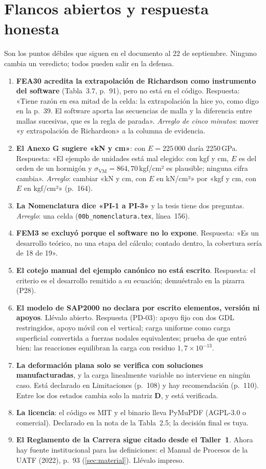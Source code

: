 \documentclass[11pt,a4paper]{article}
\begin{document}
\section{Flancos abiertos y respuesta honesta}\label{sec:flancos}

Son los puntos débiles que siguen en el documento al 22 de septiembre. Ninguno cambia un veredicto; todos pueden salir en la defensa.

\begin{enumerate}[leftmargin=1.6em]
\item \textbf{FEA30 acredita la extrapolación de Richardson como instrumento del software} (Tabla~3.7, p.~91), pero no está en el código. Respuesta: «Tiene razón en esa mitad de la celda: la extrapolación la hice yo, como digo en la p.~39. El software aporta las secuencias de malla y la diferencia entre mallas sucesivas, que es la regla de parada». \emph{Arreglo de cinco minutos}: mover «y extrapolación de Richardson» a la columna de evidencia.
\item \textbf{El Anexo G sugiere «kN y cm»}: con $E=225\,000$ daría 2250\,GPa. Respuesta: «El ejemplo de unidades está mal elegido: con kgf y cm, $E$ es del orden de un hormigón y $\sigma_{\mathrm{VM}}=864{,}70$\,kgf/cm² es plausible; ninguna cifra cambia». \emph{Arreglo}: cambiar «kN y cm, con $E$ en kN/cm²» por «kgf y cm, con $E$ en kgf/cm²» (p.~164).
\item \textbf{La Nomenclatura dice «PI-1 a PI-3»} y la tesis tiene dos preguntas. \emph{Arreglo}: una celda (\texttt{00b\_nomenclatura.tex}, línea~156).
\item \textbf{FEM3 se excluyó porque el software no lo expone}. Respuesta: «Es un desarrollo teórico, no una etapa del cálculo; contado dentro, la cobertura sería de 18 de 19».
\item \textbf{El cotejo manual del ejemplo canónico no está escrito}. Respuesta: el criterio es el desarrollo remitido a su ecuación; demuéstralo en la pizarra (P28).
\item \textbf{El modelo de SAP2000 no declara por escrito elementos, versión ni apoyos}. Llévalo abierto. Respuesta (PD-03): apoyo fijo con dos GDL restringidos, apoyo móvil con el vertical; carga uniforme como carga superficial convertida a fuerzas nodales equivalentes; prueba de que entró bien: las reacciones equilibran la carga con residuo $1{,}7\times10^{-13}$.
\item \textbf{La deformación plana solo se verifica con soluciones manufacturadas}, y la carga linealmente variable no interviene en ningún caso. Está declarado en Limitaciones (p.~108) y hay recomendación (p.~110). Entre los dos estados cambia solo la matriz $\mathbf{D}$, y está verificada.
\item \textbf{La licencia}: el código es MIT y el binario lleva PyMuPDF (AGPL-3.0 o comercial). Declarado en la nota de la Tabla~2.5; la decisión final es tuya.
\item \textbf{El Reglamento de la Carrera sigue citado desde el Taller~1}. Ahora hay fuente institucional para las definiciones: el Manual de Procesos de la UATF (2022), p.~93 (\autoref{sec:material}). Llévalo impreso.
\end{enumerate}
\end{document}
